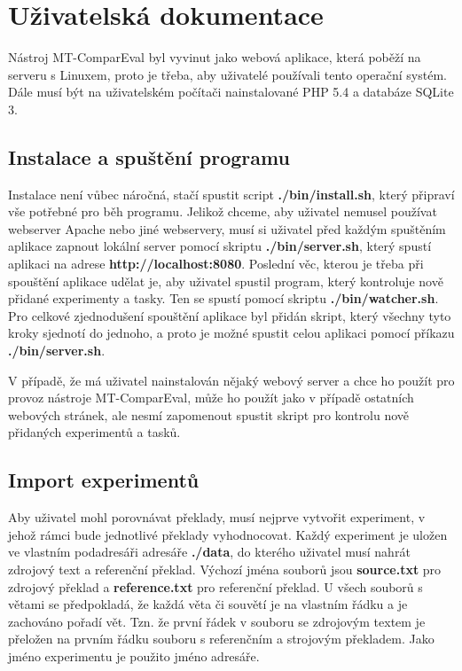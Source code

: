 \chapter{Uživatelská dokumentace}
Nástroj MT-ComparEval byl vyvinut jako webová aplikace,
  která poběží na serveru s Linuxem,
  proto je třeba,
  aby uživatelé používali tento operační systém.
Dále musí být na uživatelském počítači nainstalované PHP 5.4 a databáze SQLite 3.

\section{Instalace a spuštění programu}
Instalace není vůbec náročná,
  stačí spustit script \textbf{./bin/install.sh},
  který připraví vše potřebné pro běh programu. 
Jelikož chceme,
  aby uživatel nemusel používat webserver Apache nebo jiné webservery,
  musí si uživatel před každým spuštěním aplikace zapnout lokální server pomocí skriptu \textbf{./bin/server.sh},
  který spustí aplikaci na adrese \textbf{http://localhost:8080}.
Poslední věc,
  kterou je třeba při spouštění aplikace udělat je,
  aby uživatel spustil program,
  který kontroluje nově přidané experimenty a tasky.
Ten se spustí pomocí skriptu \textbf{./bin/watcher.sh}.
Pro celkové zjednodušení spouštění aplikace byl přidán skript,
  který všechny tyto kroky sjednotí do jednoho,
  a proto je možné spustit celou aplikaci pomocí příkazu \textbf{./bin/server.sh}.

V případě, že má uživatel nainstalován nějaký webový server
  a chce ho použít pro provoz nástroje MT-ComparEval,
  může ho použít jako v případě ostatních webových stránek,
  ale nesmí zapomenout spustit skript pro kontrolu nově přidaných experimentů a tasků.

\section{Import experimentů}
Aby uživatel mohl porovnávat překlady,
  musí nejprve vytvořit experiment,
  v jehož rámci bude jednotlivé překlady vyhodnocovat.
Každý experiment je uložen ve vlastním podadresáři adresáře \textbf{./data},
  do kterého uživatel musí nahrát zdrojový text a referenční překlad.
Výchozí jména souborů jsou \textbf{source.txt} pro zdrojový překlad
  a \textbf{reference.txt} pro referenční překlad.
U všech souborů s větami se předpokladá,
  že každá věta či souvětí je na vlastním řádku
  a je zachováno pořadí vět.
Tzn. že první řádek v souboru se zdrojovým textem je přeložen na prvním řádku souboru s referenčním a strojovým překladem.
Jako jméno experimentu je použito jméno adresáře.

